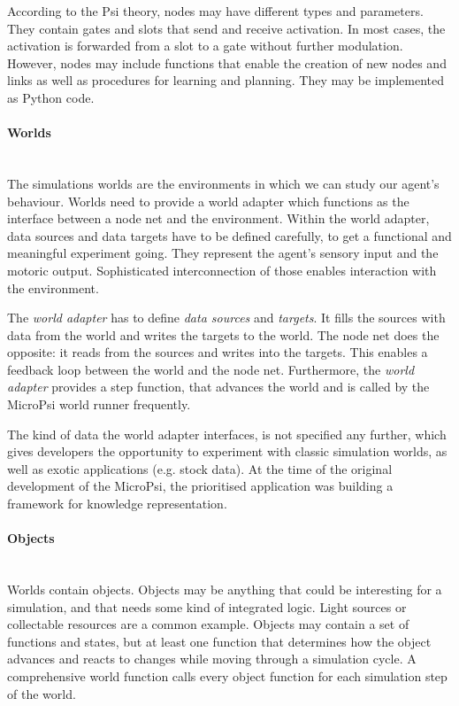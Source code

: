 According to the Psi theory, nodes may have different types and parameters. They contain gates and slots that send and receive activation. In most cases, the activation is forwarded from a slot to a gate without further modulation. However, nodes may include functions that enable the creation of new nodes and links as well as procedures for learning and planning. They may be implemented as Python code.

        \paragraph{Worlds}$\;$ \\
        \label{microPsiWorld}
The simulations worlds are the environments in which we can study our agent's behaviour. Worlds need to provide a world adapter which functions as the interface between a node net and the environment. Within the world adapter, data sources and data targets have to be defined carefully, to get a functional and meaningful experiment going. They represent the agent's sensory input and the motoric output. Sophisticated interconnection of those enables interaction with the environment.

The \emph{world adapter} has to define \emph{data sources} and \emph{targets}. It fills the sources with data from the world and writes the targets to the world. The node net does the opposite: it reads from the sources and writes into the targets. This enables a feedback loop between the world and the node net. Furthermore, the \emph{world adapter} provides a step function, that advances the world and is called by the MicroPsi world runner frequently.


The kind of data the world adapter interfaces, is not specified any further, which gives developers the opportunity to experiment with classic simulation worlds, as well as exotic applications (e.g. stock data). At the time of the original development of the MicroPsi, the prioritised application was building a framework for knowledge representation.

            \paragraph{Objects}$\;$ \\
Worlds contain objects. Objects may be anything that could be interesting for a simulation, and that needs some kind of integrated logic. Light sources or collectable resources are a common example. Objects may contain a set of functions and states, but at least one function that determines how the object advances and reacts to changes while moving through a simulation cycle. A comprehensive world function calls every object function for each simulation step of the world.

